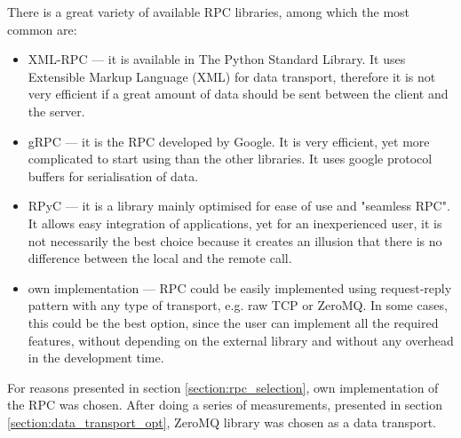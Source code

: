         There is a great variety of available RPC libraries, among which the most common are:
        \begin{itemize}
            \item XML-RPC --- it is available in The Python Standard Library. It uses Extensible Markup Language (XML) for data transport, therefore it is not very efficient if a great amount of data should be sent between the client and the server.
            \item gRPC --- it is the RPC developed by Google. It is very efficient, yet more complicated to start using than the other libraries. It uses google protocol buffers for serialisation of data.
            \item RPyC --- it is a library mainly optimised for ease of use and "seamless RPC". It allows easy integration of applications, yet for an inexperienced user, it is not necessarily the best choice because it creates an illusion that there is no difference between the local and the remote call.
            \item own implementation --- RPC could be easily implemented using request-reply pattern with any type of transport, e.g. raw TCP or ZeroMQ. In some cases, this could be the best option, since the user can implement all the required features, without depending on the external library and without any overhead in the development time.
        \end{itemize}
        For reasons presented in section \ref{section:rpc_selection}, own implementation of the RPC was chosen. After doing a series of measurements, presented in section \ref{section:data_transport_opt}, ZeroMQ library was chosen as a data transport.
    
